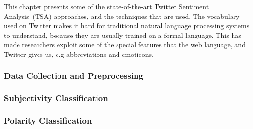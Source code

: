 This chapter presents some of the state-of-the-art Twitter Sentiment Analysis~(TSA) approaches, and the techniques that are used. The vocabulary used on Twitter makes it hard for traditional natural language processing systems to understand, because they are usually trained on a formal language. This has made researchers exploit some of the special features that the web language, and Twitter gives us, e.g abbreviations and emoticons.
	
		\subsubsection{Data Collection and Preprocessing}
		
		
		\subsubsection{Subjectivity Classification}
		
		
		\subsubsection{Polarity Classification}
		